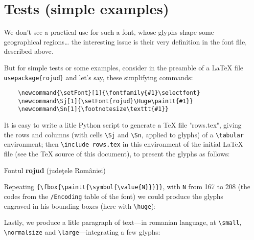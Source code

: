 \documentclass[a4paper,11pt]{article}
\newcommand{\setFont}[1]{\fontfamily{#1}\selectfont}
\newcommand\Sj[1]{\setFont{rojud}\Huge\paintt{#1}}
\newcommand\Sn[1]{\footnotesize\texttt{#1}}
\begin{document}
\section{Tests (simple examples)}

We don't see a practical use for such a font, whose glyphs shape some geographical regions\ldots{} the interesting issue is their very definition in the font file, described above.

\smallskip
But for simple tests or some examples, consider in the preamble of a LaTeX file \texttt{usepackage\{rojud\}} and let's say, these simplifying commands:

{\small
\begin{verbatim}
    \newcommand{\setFont}[1]{\fontfamily{#1}\selectfont}
    \newcommand\Sj[1]{\setFont{rojud}\Huge\paintt{#1}}
    \newcommand\Sn[1]{\footnotesize\texttt{#1}}
\end{verbatim}
}

It is easy to write a litle Python script to generate a TeX file "rows.tex", giving the rows and columns {\small(with cells \texttt{\textbackslash{}Sj} and \texttt{\textbackslash{}Sn}, applied to glyphs)} of a \texttt{\textbackslash{}tabular} environment; then \texttt{\textbackslash{}include rows.tex} in this environment of the initial LaTeX file {\small(see the TeX source of this document)}, to present the glyphs as follows:

{\centerline{Fontul \textbf{rojud} {\small(judeţele României)}}}

\bigskip 
Repeating \verb!{\fbox{\paintt{\symbol{\value{N}}}}}!, with \texttt{N} from 167 to 208 {\small(the codes from the \texttt{/Encoding} table of the font)} we could produce the glyphs engraved in his bounding boxes {\small(here with \verb!\huge!)}:

\smallskip
{
\setFont{rojud}
\fboxsep=0pt
\setcounter{N}{167}
\huge\noindent
{}%
\par\smallskip\noindent
{}%
\par\smallskip\noindent
{}%
}

\medskip
Lastly, we produce a litle paragraph of text---in romanian language, at \verb!\small!, \verb!\normalsize! and \verb!\large!---integrating a few glyphs:
\end{document}
